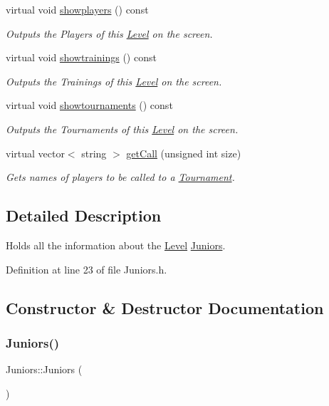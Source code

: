 \begin{DoxyCompactItemize}
virtual void \hyperlink{class_juniors_aa312c32ccc0c9d3193036c20849b8669}{showplayers} () const
\begin{DoxyCompactList}\small\item\em Outputs the Players of this \hyperlink{class_level}{Level} on the screen. \end{DoxyCompactList}\item 
virtual void \hyperlink{class_juniors_ad74d069390fffeda607de3584a0453de}{showtrainings} () const
\begin{DoxyCompactList}\small\item\em Outputs the Trainings of this \hyperlink{class_level}{Level} on the screen. \end{DoxyCompactList}\item 
virtual void \hyperlink{class_juniors_a05afe7596b708ad635ac709499e66bc1}{showtournaments} () const
\begin{DoxyCompactList}\small\item\em Outputs the Tournaments of this \hyperlink{class_level}{Level} on the screen. \end{DoxyCompactList}\item 
virtual vector$<$ string $>$ \hyperlink{class_juniors_ace1da8267f2a92dbfb9e27f7b6b95d26}{get\+Call} (unsigned int size)
\begin{DoxyCompactList}\small\item\em Gets names of players to be called to a \hyperlink{class_tournament}{Tournament}. \end{DoxyCompactList}\end{DoxyCompactItemize}


\subsection{Detailed Description}
Holds all the information about the \hyperlink{class_level}{Level} \hyperlink{class_juniors}{Juniors}. 

Definition at line 23 of file Juniors.\+h.



\subsection{Constructor \& Destructor Documentation}
\hypertarget{class_juniors_a36519a818f54755dfd1bd14e15b4fcea}{}\label{class_juniors_a36519a818f54755dfd1bd14e15b4fcea} 
\subsubsection{\texorpdfstring{Juniors()}{Juniors()}\hspace{0.1cm}{\footnotesize\ttfamily [1/2]}}
{\footnotesize\ttfamily Juniors\+::\+Juniors (\begin{DoxyParamCaption}{ }\end{DoxyParamCaption})\hspace{0.3cm}{\ttfamily [inline]}}



